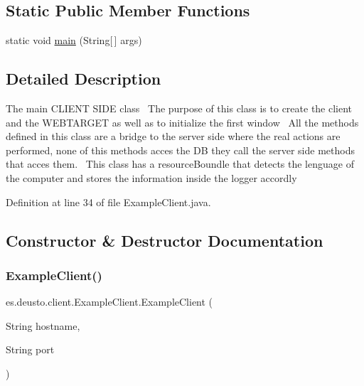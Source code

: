 \subsection*{Static Public Member Functions}
\begin{DoxyCompactItemize}
\item 
static void \hyperlink{classes_1_1deusto_1_1client_1_1_example_client_a9eadbc017db92b83cad1f6b72c10bae2}{main} (String\mbox{[}$\,$\mbox{]} args)
\end{DoxyCompactItemize}


\subsection{Detailed Description}
The main C\+L\+I\+E\+NT S\+I\+DE class~\newline
The purpose of this class is to create the client and the W\+E\+B\+T\+A\+R\+G\+ET as well as to initialize the first window~\newline
All the methods defined in this class are a bridge to the server side where the real actions are performed, none of this methods acces the DB they call the server side methods that acces them.~\newline
This class has a resource\+Boundle that detects the lenguage of the computer and stores the information inside the logger accordly 

Definition at line 34 of file Example\+Client.\+java.



\subsection{Constructor \& Destructor Documentation}
\mbox{\label{classes_1_1deusto_1_1client_1_1_example_client_afe4bf9d0ff661de1e0ba936df0ce807f}} 
\subsubsection{\texorpdfstring{Example\+Client()}{ExampleClient()}}
{\footnotesize\ttfamily es.\+deusto.\+client.\+Example\+Client.\+Example\+Client (\begin{DoxyParamCaption}\item[{String}]{hostname,  }\item[{String}]{port }\end{DoxyParamCaption})}


